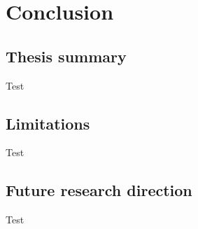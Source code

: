 \chapter{Conclusion}

\ifpdf
    \graphicspath{{Chapter3/Figs/Raster/}{Chapter3/Figs/PDF/}{Chapter3/Figs/}}
\else
    \graphicspath{{Chapter3/Figs/Vector/}{Chapter3/Figs/}}
\fi


\section{Thesis summary}

Test

\section{Limitations}

Test

\section{Future research direction}

Test